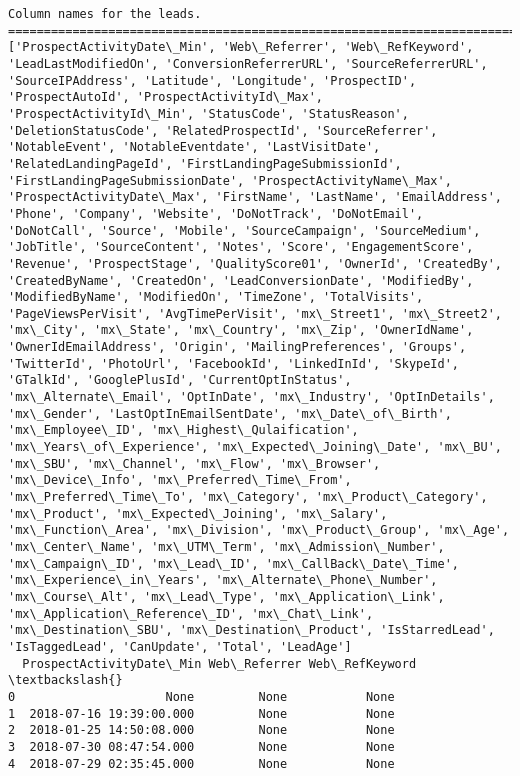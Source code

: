\documentclass[11pt]{article}
\begin{document}
    \begin{Verbatim}[commandchars=\\\{\}]
Column names for the leads.
====================================================================================================
['ProspectActivityDate\_Min', 'Web\_Referrer', 'Web\_RefKeyword', 'LeadLastModifiedOn', 'ConversionReferrerURL', 'SourceReferrerURL', 'SourceIPAddress', 'Latitude', 'Longitude', 'ProspectID', 'ProspectAutoId', 'ProspectActivityId\_Max', 'ProspectActivityId\_Min', 'StatusCode', 'StatusReason', 'DeletionStatusCode', 'RelatedProspectId', 'SourceReferrer', 'NotableEvent', 'NotableEventdate', 'LastVisitDate', 'RelatedLandingPageId', 'FirstLandingPageSubmissionId', 'FirstLandingPageSubmissionDate', 'ProspectActivityName\_Max', 'ProspectActivityDate\_Max', 'FirstName', 'LastName', 'EmailAddress', 'Phone', 'Company', 'Website', 'DoNotTrack', 'DoNotEmail', 'DoNotCall', 'Source', 'Mobile', 'SourceCampaign', 'SourceMedium', 'JobTitle', 'SourceContent', 'Notes', 'Score', 'EngagementScore', 'Revenue', 'ProspectStage', 'QualityScore01', 'OwnerId', 'CreatedBy', 'CreatedByName', 'CreatedOn', 'LeadConversionDate', 'ModifiedBy', 'ModifiedByName', 'ModifiedOn', 'TimeZone', 'TotalVisits', 'PageViewsPerVisit', 'AvgTimePerVisit', 'mx\_Street1', 'mx\_Street2', 'mx\_City', 'mx\_State', 'mx\_Country', 'mx\_Zip', 'OwnerIdName', 'OwnerIdEmailAddress', 'Origin', 'MailingPreferences', 'Groups', 'TwitterId', 'PhotoUrl', 'FacebookId', 'LinkedInId', 'SkypeId', 'GTalkId', 'GooglePlusId', 'CurrentOptInStatus', 'mx\_Alternate\_Email', 'OptInDate', 'mx\_Industry', 'OptInDetails', 'mx\_Gender', 'LastOptInEmailSentDate', 'mx\_Date\_of\_Birth', 'mx\_Employee\_ID', 'mx\_Highest\_Qulaification', 'mx\_Years\_of\_Experience', 'mx\_Expected\_Joining\_Date', 'mx\_BU', 'mx\_SBU', 'mx\_Channel', 'mx\_Flow', 'mx\_Browser', 'mx\_Device\_Info', 'mx\_Preferred\_Time\_From', 'mx\_Preferred\_Time\_To', 'mx\_Category', 'mx\_Product\_Category', 'mx\_Product', 'mx\_Expected\_Joining', 'mx\_Salary', 'mx\_Function\_Area', 'mx\_Division', 'mx\_Product\_Group', 'mx\_Age', 'mx\_Center\_Name', 'mx\_UTM\_Term', 'mx\_Admission\_Number', 'mx\_Campaign\_ID', 'mx\_Lead\_ID', 'mx\_CallBack\_Date\_Time', 'mx\_Experience\_in\_Years', 'mx\_Alternate\_Phone\_Number', 'mx\_Course\_Alt', 'mx\_Lead\_Type', 'mx\_Application\_Link', 'mx\_Application\_Reference\_ID', 'mx\_Chat\_Link', 'mx\_Destination\_SBU', 'mx\_Destination\_Product', 'IsStarredLead', 'IsTaggedLead', 'CanUpdate', 'Total', 'LeadAge']
  ProspectActivityDate\_Min Web\_Referrer Web\_RefKeyword  \textbackslash{}
0                     None         None           None   
1  2018-07-16 19:39:00.000         None           None   
2  2018-01-25 14:50:08.000         None           None   
3  2018-07-30 08:47:54.000         None           None   
4  2018-07-29 02:35:45.000         None           None   


\end{Verbatim}
\end{document}
